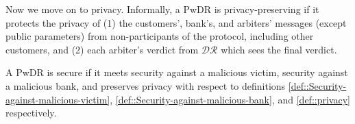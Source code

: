 Now we move on to privacy. Informally, a PwDR is privacy-preserving if it protects the privacy of (1) the customers', bank's, and arbiters' messages (except public parameters) from  non-participants of the protocol, including other customers, and (2) each   arbiter's verdict from $\mathcal{DR}$  which sees the final verdict. 







\begin{definition}[Security]\label{def::PwDR-security}
A PwDR is secure if it meets security against a malicious victim,  security against a malicious bank, and preserves privacy with respect to definitions \ref{def::Security-against-malicious-victim}, \ref{def::Security-against-malicious-bank}, and \ref{def::privacy} respectively. 
\end{definition}




